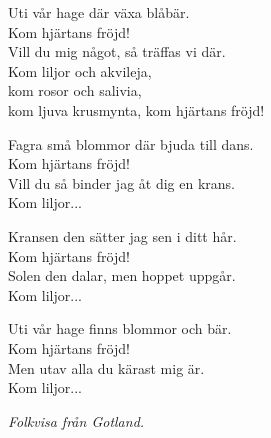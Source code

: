 \vspace{10pt}
Uti vår hage där växa blåbär.\\
Kom hjärtans fröjd!\\
Vill du mig något, så träffas vi där.\\
Kom liljor och akvileja,\\
kom rosor och salivia,\\
kom ljuva krusmynta, kom hjärtans fröjd!\par
\vspace{10pt}
Fagra små blommor där bjuda till dans.\\
Kom hjärtans fröjd!\\
Vill du så binder jag åt dig en krans.\\
Kom liljor...\par
\vspace{10pt}
Kransen den sätter jag sen i ditt hår.\\
Kom hjärtans fröjd!\\
Solen den dalar, men hoppet uppgår.\\
Kom liljor...\par
\vspace{10pt}
Uti vår hage finns blommor och bär.\\
Kom hjärtans fröjd!\\
Men utav alla du kärast mig är.\\
Kom liljor...
\par
\vspace{10pt}
{\footnotesize\textit{Folkvisa från Gotland.}}
